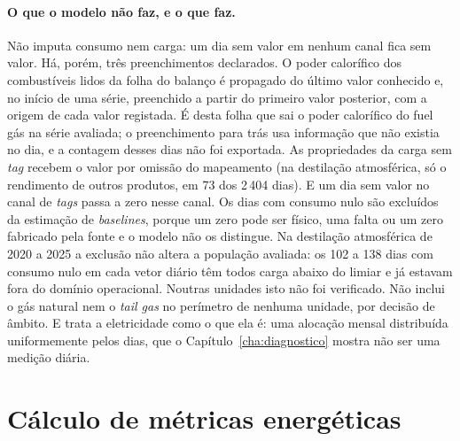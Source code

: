 \paragraph{O que o modelo não faz, e o que faz.} Não imputa consumo nem
carga: um dia sem valor em nenhum canal fica sem valor. Há, porém, três
preenchimentos declarados. O poder calorífico dos combustíveis lidos da
folha do balanço é propagado do último valor conhecido e, no início de uma
série, preenchido a partir do primeiro valor posterior, com a origem de cada
valor registada. É desta folha que sai o poder calorífico do fuel gás na
série avaliada; o preenchimento para trás usa informação que não existia no
dia, e a contagem desses dias não foi exportada. As propriedades da carga
sem \emph{tag} recebem o valor por omissão do mapeamento (na destilação
atmosférica, só o rendimento de outros produtos, em 73 dos 2\,404 dias). E
um dia sem valor no canal de \emph{tags} passa a zero nesse canal. Os dias com
consumo nulo são excluídos da estimação de \emph{baselines}, porque um zero
pode ser físico, uma falta ou um zero fabricado pela fonte e o modelo não
os distingue. Na destilação atmosférica de 2020 a 2025 a exclusão não
altera a população avaliada: os 102 a 138 dias com consumo nulo em cada vetor
diário têm todos carga abaixo do limiar e já estavam fora do domínio
operacional. Noutras unidades isto não foi verificado. Não inclui o gás natural nem o
\emph{tail gas} no perímetro de nenhuma unidade, por decisão de âmbito.
E trata a eletricidade como o que ela é: uma alocação mensal distribuída
uniformemente pelos dias, que o Capítulo~\ref{cha:diagnostico} mostra não
ser uma medição diária.

\section{Cálculo de métricas energéticas}
\label{sec:metricas}

